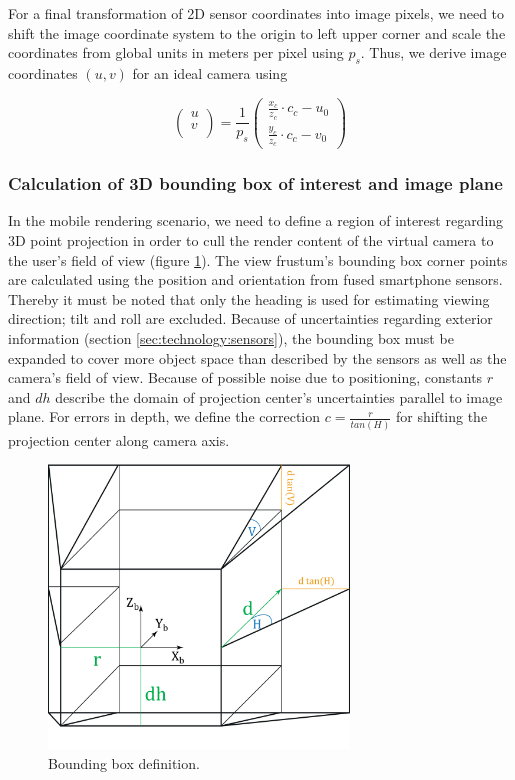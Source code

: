 \documentclass[review]{elsarticle}
\begin{document}
For a final transformation of 2D sensor coordinates into image pixels, we need to shift the image coordinate system to the origin to left upper corner and scale the coordinates from global units in meters per pixel using $p_s$. Thus, we derive image coordinates $(u,v)$ for an ideal camera using

\begin{equation}
\begin{pmatrix}
u\\
v\\
\end{pmatrix}
= \frac{1}{p_s}
\begin{pmatrix}
\frac{x_c}{z_c} \cdot c_c  - {u}_0 \\
\frac{y_c}{z_c}\cdot c_c  - {v}_0 
\end{pmatrix}
\label{eq:final_ps}
\end{equation}

\subsubsection{Calculation of 3D bounding box of interest and image plane}
In the mobile rendering scenario, we need to define a region of interest regarding 3D point projection in order to cull the render content of the virtual camera to the user's field of view (figure \ref{fig:4_3_bounding_box}). The view frustum's bounding box corner points are calculated using the position and orientation from fused smartphone sensors. Thereby it must be noted that only the heading is used for estimating viewing direction; tilt and roll are excluded. Because of uncertainties regarding exterior information (section \ref{sec:technology:sensors}), the bounding box must be expanded to cover more object space than described by the sensors as well as the camera's field of view. Because of possible noise due to positioning, constants $r$ and $dh$ describe the domain of projection center's uncertainties parallel to image plane. For errors in depth, we define the correction $c = \frac{r}{tan(H)}$ for shifting the projection center along camera axis. 

\begin{figure}[h]
\centering
\includegraphics[width=8cm]{graphics/4_3_Bounding_Box}
\caption{Bounding box definition.}
\label{fig:4_3_bounding_box}
\end{figure}
\end{document}
